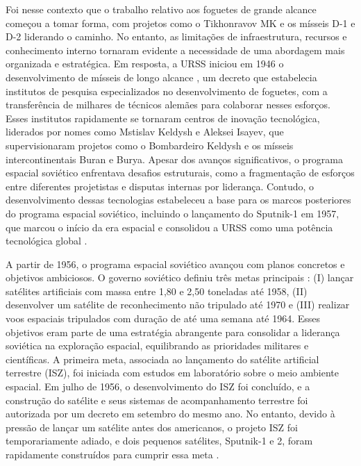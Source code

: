 Foi nesse contexto que o trabalho relativo aos foguetes de grande alcance começou a tomar forma, com projetos como o Tikhonravov MK e os mísseis D-1 e D-2 liderando o caminho. No entanto, as limitações de infraestrutura, recursos e conhecimento interno tornaram evidente a necessidade de uma abordagem mais organizada e estratégica. Em resposta, a URSS iniciou em 1946 o desenvolvimento de mísseis de longo alcance \citep{siddiqi2004}, um decreto que estabelecia institutos de pesquisa especializados no desenvolvimento de foguetes, com a transferência de milhares de técnicos alemães para colaborar nesses esforços. Esses institutos rapidamente se tornaram centros de inovação tecnológica, liderados por nomes como Mstislav Keldysh e Aleksei Isayev, que supervisionaram projetos como o Bombardeiro Keldysh e os mísseis intercontinentais Buran e Burya. Apesar dos avanços significativos, o programa espacial soviético enfrentava desafios estruturais, como a fragmentação de esforços entre diferentes projetistas e disputas internas por liderança. Contudo, o desenvolvimento dessas tecnologias estabeleceu a base para os marcos posteriores do programa espacial soviético, incluindo o lançamento do Sputnik-1 em 1957, que marcou o início da era espacial e consolidou a URSS como uma potência tecnológica global \citep{betzler2024}.

A partir de 1956, o programa espacial soviético avançou com planos concretos e objetivos ambiciosos. O governo soviético definiu três metas principais \citep{betzler2024}: (I) lançar satélites artificiais com massa entre 1,80 e 2,50 toneladas até 1958, (II) desenvolver um satélite de reconhecimento não tripulado até 1970 e (III) realizar voos espaciais tripulados com duração de até uma semana até 1964. Esses objetivos eram parte de uma estratégia abrangente para consolidar a liderança soviética na exploração espacial, equilibrando as prioridades militares e científicas. A primeira meta, associada ao lançamento do satélite artificial terrestre (ISZ), foi iniciada com estudos em laboratório sobre o meio ambiente espacial. Em julho de 1956, o desenvolvimento do ISZ foi concluído, e a construção do satélite e seus sistemas de acompanhamento terrestre foi autorizada por um decreto em setembro do mesmo ano. No entanto, devido à pressão de lançar um satélite antes dos americanos, o projeto ISZ foi temporariamente adiado, e dois pequenos satélites, Sputnik-1 e 2, foram rapidamente construídos para cumprir essa meta \citep{betzler2024}.

